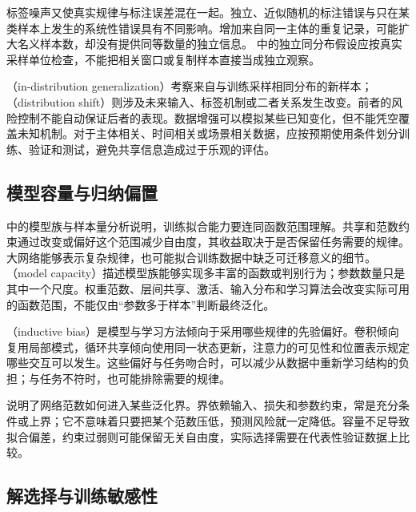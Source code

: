 标签噪声又使真实规律与标注误差混在一起。独立、近似随机的标注错误与只在某类样本上发生的系统性错误具有不同影响。增加来自同一主体的重复记录，可能扩大名义样本数，却没有提供同等数量的独立信息。
中的独立同分布假设应按真实采样单位检查，不能把相关窗口或复制样本直接当成独立观察。

（in-distribution generalization）考察来自与训练采样相同分布的新样本；（distribution shift）则涉及未来输入、标签机制或二者关系发生改变。前者的风险控制不能自动保证后者的表现。数据增强可以模拟某些已知变化，但不能凭空覆盖未知机制。对于主体相关、时间相关或场景相关数据，应按预期使用条件划分训练、验证和测试，避免共享信息造成过于乐观的评估。

\subsection{模型容量与归纳偏置}
\label{sec:generalization-capacity}

中的模型族与样本量分析说明，训练拟合能力要连同函数范围理解。共享和范数约束通过改变或偏好这个范围减少自由度，其收益取决于是否保留任务需要的规律。大网络能够表示复杂规律，也可能拟合训练数据中缺乏可迁移意义的细节。（model capacity）描述模型族能够实现多丰富的函数或判别行为；参数数量只是其中一个尺度。权重范数、层间共享、激活、输入分布和学习算法会改变实际可用的函数范围，不能仅由“参数多于样本”判断最终泛化。

（inductive bias）是模型与学习方法倾向于采用哪些规律的先验偏好。卷积倾向复用局部模式，循环共享倾向使用同一状态更新，注意力的可见性和位置表示规定哪些交互可以发生。这些偏好与任务吻合时，可以减少从数据中重新学习结构的负担；与任务不符时，也可能排除需要的规律。

说明了网络范数如何进入某些泛化界。界依赖输入、损失和参数约束，常是充分条件或上界；它不意味着只要把某个范数压低，预测风险就一定降低。容量不足导致拟合偏差，约束过弱则可能保留无关自由度，实际选择需要在代表性验证数据上比较。

\subsection{解选择与训练敏感性}
\label{sec:generalization-solution-selection}

